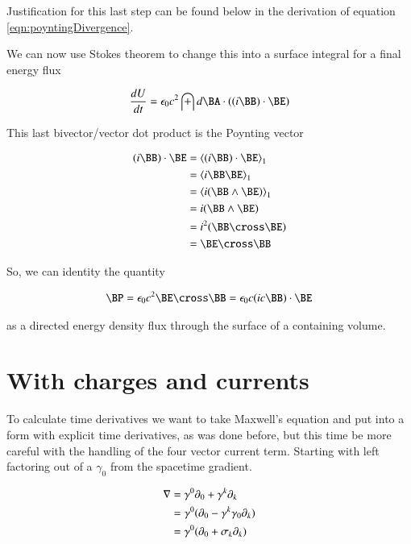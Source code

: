 \documentclass{article}
\begin{document}
Justification for this last step can be found below in the derivation of equation \ref{eqn:poyntingDivergence}.

We can now use Stokes theorem to change this into a surface integral for a final energy flux 

\begin{align*}
\frac{dU}{dt} 
&= \epsilon_0 c^2 \int d\BA \cdot ( (i \BB) \cdot \BE ) \\
\end{align*}

This last bivector/vector dot product is the Poynting vector

\begin{align*}
(i \BB) \cdot \BE 
&= \gpgradeone{ (i \BB) \cdot \BE } \\
&= \gpgradeone{ i \BB \BE } \\
&= \gpgradeone{ i (\BB \wedge \BE) } \\
&= i (\BB \wedge \BE) \\
&= i^2(\BB \cross \BE) \\
&= \BE \cross \BB \\
\end{align*}

So, we can identity the quantity 

\begin{align}\label{eqn:poynting}
\BP = \epsilon_0 c^2 \BE \cross \BB = \epsilon_0 c (i c \BB) \cdot \BE 
\end{align}

as a directed energy density flux through the surface of a containing volume.

\section{ With charges and currents }
 
To calculate time derivatives we want to take Maxwell's equation and put into a form with explicit time derivatives, as was done before, but this time be more careful with the handling of the four vector current term.  Starting with left factoring out of a $\gamma_0$ from the spacetime gradient. 
 
\begin{align*}
\nabla &= \gamma^0 \partial_0 + \gamma^k \partial_k \\
&= \gamma^0 (\partial_0 - \gamma^k \gamma_0 \partial_k) \\
&= \gamma^0 (\partial_0 + \sigma_k \partial_k) \\
\end{align*}
\end{document}

